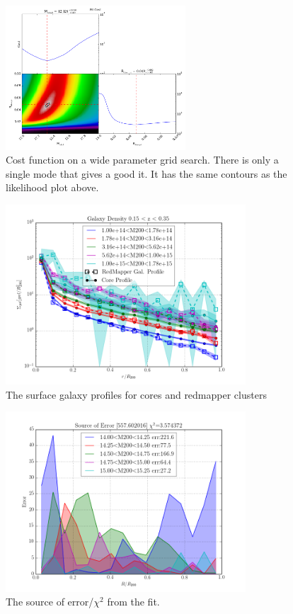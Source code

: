 \documentclass[twocolumn]{article}
\begin{document}
\begin{figure}[H]
  \center\includegraphics[width=0.6\textwidth]{figs/cfn/basic_rd_wide.param/calc_likelihood_bounds.py/fig2.png}
  \caption{Cost function on a wide parameter grid search. There is only a single mode that gives a good it. It has the same
  contours as the likelihood plot above.}
  \label{fig:basic_rd:cost}
\end{figure}

\begin{figure}[H]
  \center\includegraphics[width=0.8\textwidth]{figs/cfn/basic_rd.param/plot_zmrs.py/fig1.png}
  \caption{The surface galaxy profiles for cores and redmapper clusters}
  \label{fig:basic_rd:profile}
\end{figure}

\begin{figure}[H]
  \center\includegraphics[width=0.8\textwidth]{figs/cfn/basic_rd.param/plot_zmrs.py/fig9.png}
  \caption{The source of error/$\chi^{2}$ from the fit. }
  \label{fig:basic_rd:error}
\end{figure}
\end{document}
